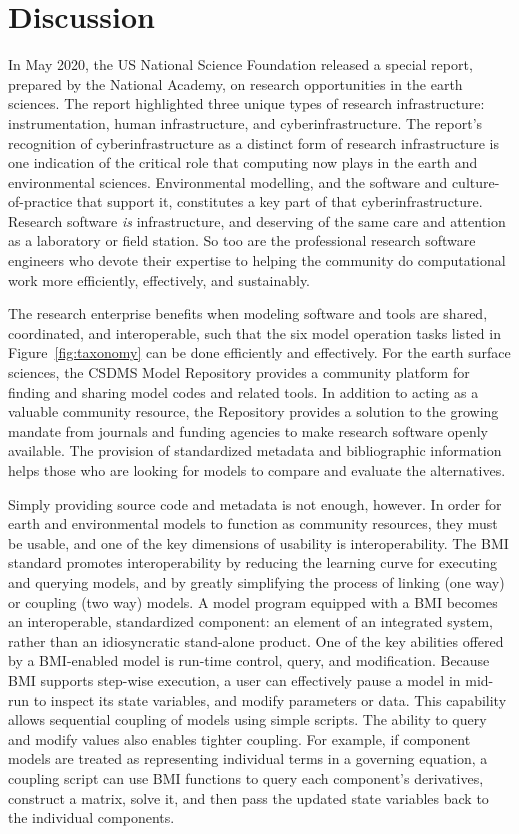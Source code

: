 \documentclass[12pt]{amsart}
\begin{document}
\section{Discussion}
\label{sec:discussion}

In May 2020, the US National Science Foundation released a special report, prepared by the National Academy, on research opportunities in the earth sciences. The report highlighted three unique types of research infrastructure: instrumentation, human infrastructure, and cyberinfrastructure. The report's recognition of cyberinfrastructure as a distinct form of research infrastructure is one indication of the critical role that computing now plays in the earth and environmental sciences. Environmental modelling, and the software and culture-of-practice that support it, constitutes a key part of that cyberinfrastructure. Research software \textit{is} infrastructure, and deserving of the same care and attention as a laboratory or field station. So too are the professional research software engineers who devote their expertise to helping the community do computational work more efficiently, effectively, and sustainably.

The research enterprise benefits when modeling  software and tools are shared, coordinated, and interoperable, such that the six model operation tasks listed in Figure~\ref{fig:taxonomy} can be done efficiently and effectively. For the earth surface sciences, the CSDMS Model Repository provides a community platform for finding and sharing model codes and related tools. In addition to acting as a valuable community resource, the Repository provides a solution to the growing mandate from journals and funding agencies to make research software openly available. The provision of standardized metadata and bibliographic information helps those who are looking for models to compare and evaluate the alternatives.

Simply providing source code and metadata is not enough, however. In order for earth and environmental models to function as community resources, they must be usable, and one of the key dimensions of usability is interoperability. The BMI standard promotes interoperability by reducing the learning curve for executing and querying models, and by greatly simplifying the process of linking (one way) or coupling (two way) models. A model program equipped with a BMI becomes an interoperable, standardized component: an element of an integrated system, rather than an idiosyncratic stand-alone product. One of the key abilities offered by a BMI-enabled model is run-time control, query, and modification. Because BMI supports step-wise execution, a user can effectively pause a model in mid-run to inspect its state variables, and modify parameters or data. This capability allows sequential coupling of models using simple scripts. The ability to query and modify values also enables tighter coupling. For example, if  component models are treated as representing individual terms in a governing equation, a coupling script can use BMI functions to query each component's derivatives, construct a matrix, solve it, and then pass the updated state variables back to the individual components.
\end{document}
